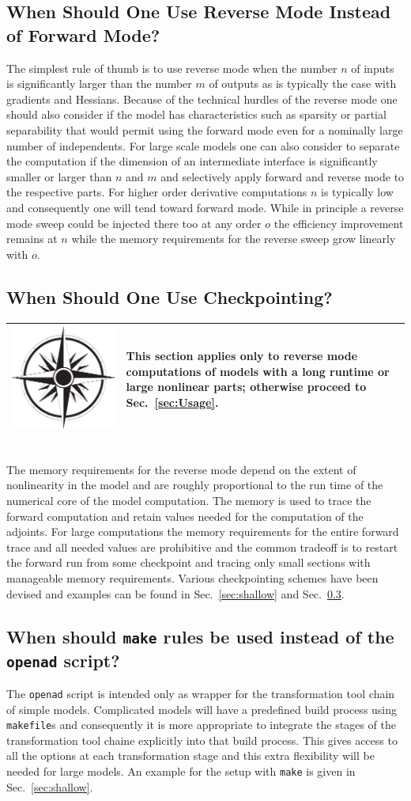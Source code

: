 \documentclass{book}
\newcommand{\refsec}[1]{{Sec.~\ref{#1}}}
\newcommand{\nav}[1]{
\begin{tabular}{|m{.03\textwidth}|m{.9\textwidth}|}\hline
\vspace{1mm}
\includegraphics[width=.03\textwidth]{windrose_zh1}&
\vspace{1mm}
\begin{minipage}[c]{.86\textwidth}
\small {#1}
\end{minipage}
\vspace{1mm}
\\\hline
\end{tabular}
}
\begin{document}
\subsection{When Should One Use Reverse Mode Instead of Forward Mode?}\label{sec:reverseInsteadOfForward}
The simplest rule of thumb is to use reverse mode when the number $n$ of inputs is significantly larger than the 
number $m$  of outputs as is typically the case with gradients and Hessians. 
Because of the technical hurdles of the reverse mode one should also consider if the model 
has characteristics such as sparsity or  partial separability that would permit using the forward mode 
even for a nominally large number of independents. 
For large scale models one can also consider to separate the computation if the dimension 
of an intermediate interface is significantly smaller or larger than $n$ and $m$ 
and selectively apply forward and reverse mode to the respective parts. For higher order derivative 
computations $n$ is typically low and consequently one will tend toward 
forward mode. While in principle a reverse mode sweep could be injected there too at any order $o$ 
the efficiency improvement remains at $n$ while the memory requirements for the reverse sweep 
grow linearly with $o$.

\subsection{When Should One Use Checkpointing?}\label{sec:Checkpointing}
\nav{This section applies only to reverse mode computations of models with a long runtime or large  
nonlinear parts; otherwise proceed to \refsec{sec:Usage}.}\\[1ex]
The memory requirements for the reverse mode depend on the extent of nonlinearity in the model 
and are roughly proportional to the run time of the numerical core of the model computation.
The memory is used to trace the forward  computation and retain values needed for the computation 
of the adjoints. 
For large computations the memory requirements for the entire forward trace and all needed 
values are prohibitive and the common tradeoff is to restart the forward run from 
some checkpoint and tracing only small sections with manageable memory requirements. 
Various checkpointing schemes have been devised and examples can be found in \refsec{sec:shallow} 
and \refsec{sec:useMake}. 

\subsection{When should \lstinline{make} rules be used instead of the \lstinline{openad} script?}\label{sec:useMake}
The \lstinline{openad} script is intended only as wrapper for the transformation tool chain of simple models. 
Complicated models will have a predefined build process using \lstinline{makefile}s and consequently 
it is more appropriate to integrate the stages of the transformation tool chaine explicitly into that
build process. 
This gives access to all the options at each transformation stage and this extra flexibility 
will be needed for large models. An example for the setup with \lstinline{make} is given in \refsec{sec:shallow}.    
\end{document}
